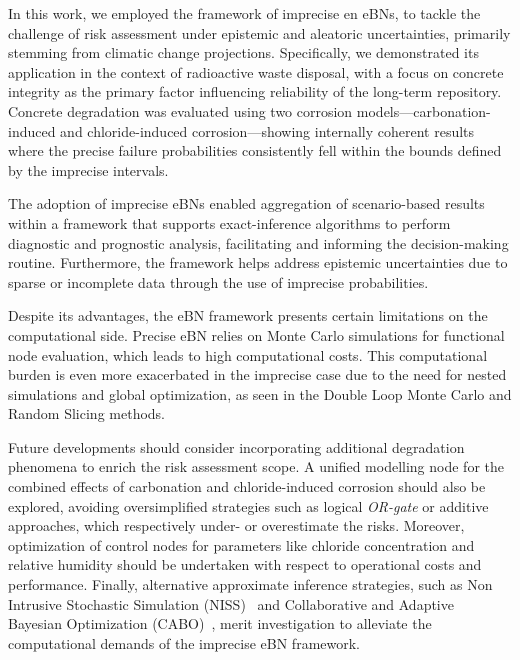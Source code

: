 In this work, we employed the framework of imprecise en eBNs, to tackle the challenge of risk assessment under epistemic and aleatoric uncertainties, primarily stemming from climatic change projections. Specifically, we demonstrated its application in the context of radioactive waste disposal, with a focus on concrete integrity as the primary factor influencing reliability of the long-term repository. Concrete degradation was evaluated using two corrosion models—carbonation-induced and chloride-induced corrosion—showing internally coherent results where the precise failure probabilities consistently fell within the bounds defined by the imprecise intervals.

The adoption of imprecise eBNs enabled aggregation of scenario-based results within a framework that supports exact-inference algorithms to perform diagnostic and prognostic analysis, facilitating and informing the decision-making routine. Furthermore, the framework helps address epistemic uncertainties due to sparse or incomplete data through the use of imprecise probabilities.

Despite its advantages, the eBN framework presents certain limitations on the computational side. Precise eBN relies on Monte Carlo simulations for functional node evaluation, which leads to high computational costs. This computational burden is even more exacerbated in the imprecise case due to the need for nested simulations and global optimization, as seen in the Double Loop Monte Carlo and Random Slicing methods.

Future developments should consider incorporating additional degradation phenomena to enrich the risk assessment scope. A unified modelling node for the combined effects of carbonation and chloride-induced corrosion should also be explored, avoiding oversimplified strategies such as logical \textit{OR-gate} or additive approaches, which respectively under- or overestimate the risks. Moreover, optimization of control nodes for parameters like chloride concentration and relative humidity should be undertaken with respect to operational costs and performance. Finally, alternative approximate inference strategies, such as Non Intrusive Stochastic Simulation (NISS)~\cite{wei_non-intrusive_2019} and Collaborative and Adaptive Bayesian Optimization (CABO)~\cite{hong_sequential_2024}, merit investigation to alleviate the computational demands of the imprecise eBN framework.
